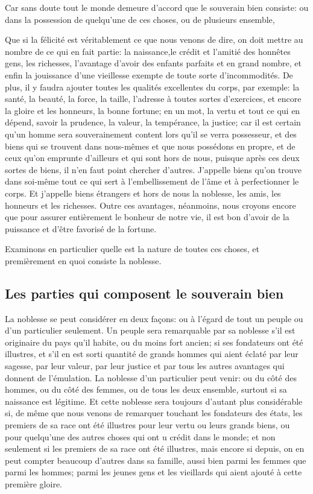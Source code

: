 Car sans doute tout le monde demeure d'accord que le souverain bien consiste: ou dans la possession de quelqu'une
de ces choses, ou de plusieurs ensemble,

Que si la félicité est véritablement ce que nous venons de dire, on doit mettre au nombre de ce qui en fait partie:
la naissance,le crédit et l'amitié des honnêtes gens, les richesses, l'avantage d'avoir des enfants parfaits et en
grand nombre, et enfin la jouissance d'une vieillesse exempte de toute sorte d'incommodités. De plus, il y faudra
ajouter toutes les qualités excellentes du corps, par exemple: la santé, la beauté, la force, la taille, l'adresse à
toutes sortes d'exercices, et encore la gloire et les honneurs, la bonne fortune; en un mot, la vertu et tout ce qui
en dépend, savoir la prudence, la valeur, la tempérance, la justice; car il est certain qu'un homme sera souverainement
content lors qu'il se verra possesseur, et des biens qui se trouvent dans nous-mêmes et que nous possédons en propre,
et de ceux qu'on emprunte d'ailleurs et qui sont hors de nous, puisque après ces deux sortes de biens, il n'en faut
point chercher d'autres. J'appelle biens qu'on trouve dans soi-même tout ce qui sert à l'embellissement de l'âme et à
perfectionner le corps. Et j'appelle biens étrangers et hors de nous la noblesse, les amis, les honneurs et les richesses.
Outre ces avantages, néanmoins, nous croyons encore que pour assurer entièrement le bonheur de notre vie, il est bon
d'avoir de la puissance et d'être favorisé de la fortune.

Examinons en particulier quelle est la nature de toutes ces choses, et premièrement en quoi consiste la noblesse.

\subsection{Les parties qui composent le souverain bien}

La noblesse se peut considérer en deux façons: ou à l'égard de tout un peuple ou d'un particulier seulement. Un peuple
sera remarquable par sa noblesse s'il est originaire du pays qu'il habite, ou du moins fort ancien; si ses fondateurs
ont été illustres, et s'il en est sorti quantité de grands hommes qui aient éclaté par leur sagesse, par leur valeur,
par leur justice et par tous les autres avantages qui donnent de l’émulation. La noblesse d'un particulier peut venir:
ou du côté des hommes, ou du côté des femmes, ou de tous les deux ensemble, surtout si sa naissance est légitime. Et
cette noblesse sera toujours d'autant plus considérable si, de même que nous venons de remarquer touchant les fondateurs
des états, les premiers de sa race ont été illustres pour leur vertu ou leurs grands biens, ou pour quelqu'une des autres
choses qui ont u crédit dans le monde; et non seulement si les premiers de sa race ont été illustres, mais encore si depuis,
on en peut compter beaucoup d'autres dans sa famille, aussi bien parmi les femmes que parmi les hommes; parmi les jeunes
gens et les vieillards qui aient ajouté à cette première gloire.

